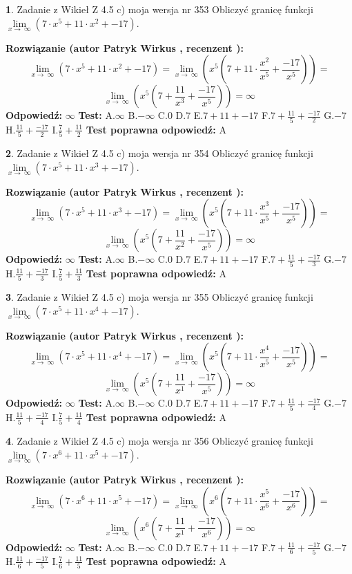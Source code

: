 \documentclass[12pt, a4paper]{article}
\theoremstyle{definition} %
\newtheorem{zad}{}
\newcommand{\zadStart}[1]{\begin{zad}#1\newline}
\newcommand{\zadStop}{\end{zad}}
\newcommand{\rozwStart}[2]{\noindent \textbf{Rozwiązanie (autor #1 , recenzent #2): }\newline}
\newcommand{\rozwStop}{\newline}
\newcommand{\odpStart}{\noindent \textbf{Odpowiedź:}\newline}
\newcommand{\odpStop}{\newline}
\newcommand{\testStart}{\noindent \textbf{Test:}\newline}
\newcommand{\testStop}{\newline}
\newcommand{\kluczStart}{\noindent \textbf{Test poprawna odpowiedź:}\newline}
\newcommand{\kluczStop}{\newline}
\begin{document}
\zadStart{Zadanie z Wikieł Z 4.5 c) moja wersja nr 353}
Obliczyć granicę funkcji  $\lim\limits_{x\to\ \infty}(7 \cdot x^{5}+11 \cdot x^{2}+-17)$.
\zadStop
\rozwStart{Patryk Wirkus}{}
$$\lim\limits_{x\to\ \infty}(7 \cdot x^{5}+11 \cdot x^{2}+-17) = \lim\limits_{x\to\ \infty}(x^{5}(7 +11 \cdot \frac{x^{2}}{x^{5}}+\frac{-17}{x^{5}})) =$$ $$\lim\limits_{x\to\ \infty}(x^{5}(7 +\frac{11}{x^{3}}+\frac{-17}{x^{5}})) =\infty$$
\rozwStop
\odpStart
$\infty$
\odpStop
\testStart
A.$\infty$ B.$-\infty$ C.$0$ D.$7$ E.$7 + 11 + -17$
F.$7+\frac{11}{5}+\frac{-17}{2}$ G.$-7$
H.$\frac{11}{5}+\frac{-17}{2}$
I.$\frac{7}{5}+\frac{11}{2}$
\testStop
\kluczStart
A
\kluczStop



\zadStart{Zadanie z Wikieł Z 4.5 c) moja wersja nr 354}
Obliczyć granicę funkcji  $\lim\limits_{x\to\ \infty}(7 \cdot x^{5}+11 \cdot x^{3}+-17)$.
\zadStop
\rozwStart{Patryk Wirkus}{}
$$\lim\limits_{x\to\ \infty}(7 \cdot x^{5}+11 \cdot x^{3}+-17) = \lim\limits_{x\to\ \infty}(x^{5}(7 +11 \cdot \frac{x^{3}}{x^{5}}+\frac{-17}{x^{5}})) =$$ $$\lim\limits_{x\to\ \infty}(x^{5}(7 +\frac{11}{x^{2}}+\frac{-17}{x^{5}})) =\infty$$
\rozwStop
\odpStart
$\infty$
\odpStop
\testStart
A.$\infty$ B.$-\infty$ C.$0$ D.$7$ E.$7 + 11 + -17$
F.$7+\frac{11}{5}+\frac{-17}{3}$ G.$-7$
H.$\frac{11}{5}+\frac{-17}{3}$
I.$\frac{7}{5}+\frac{11}{3}$
\testStop
\kluczStart
A
\kluczStop



\zadStart{Zadanie z Wikieł Z 4.5 c) moja wersja nr 355}
Obliczyć granicę funkcji  $\lim\limits_{x\to\ \infty}(7 \cdot x^{5}+11 \cdot x^{4}+-17)$.
\zadStop
\rozwStart{Patryk Wirkus}{}
$$\lim\limits_{x\to\ \infty}(7 \cdot x^{5}+11 \cdot x^{4}+-17) = \lim\limits_{x\to\ \infty}(x^{5}(7 +11 \cdot \frac{x^{4}}{x^{5}}+\frac{-17}{x^{5}})) =$$ $$\lim\limits_{x\to\ \infty}(x^{5}(7 +\frac{11}{x^{1}}+\frac{-17}{x^{5}})) =\infty$$
\rozwStop
\odpStart
$\infty$
\odpStop
\testStart
A.$\infty$ B.$-\infty$ C.$0$ D.$7$ E.$7 + 11 + -17$
F.$7+\frac{11}{5}+\frac{-17}{4}$ G.$-7$
H.$\frac{11}{5}+\frac{-17}{4}$
I.$\frac{7}{5}+\frac{11}{4}$
\testStop
\kluczStart
A
\kluczStop



\zadStart{Zadanie z Wikieł Z 4.5 c) moja wersja nr 356}
Obliczyć granicę funkcji  $\lim\limits_{x\to\ \infty}(7 \cdot x^{6}+11 \cdot x^{5}+-17)$.
\zadStop
\rozwStart{Patryk Wirkus}{}
$$\lim\limits_{x\to\ \infty}(7 \cdot x^{6}+11 \cdot x^{5}+-17) = \lim\limits_{x\to\ \infty}(x^{6}(7 +11 \cdot \frac{x^{5}}{x^{6}}+\frac{-17}{x^{6}})) =$$ $$\lim\limits_{x\to\ \infty}(x^{6}(7 +\frac{11}{x^{1}}+\frac{-17}{x^{6}})) =\infty$$
\rozwStop
\odpStart
$\infty$
\odpStop
\testStart
A.$\infty$ B.$-\infty$ C.$0$ D.$7$ E.$7 + 11 + -17$
F.$7+\frac{11}{6}+\frac{-17}{5}$ G.$-7$
H.$\frac{11}{6}+\frac{-17}{5}$
I.$\frac{7}{6}+\frac{11}{5}$
\testStop
\kluczStart
A
\kluczStop
\end{document}
